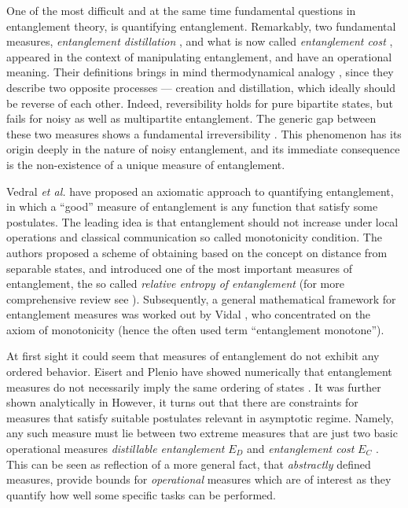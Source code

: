 \documentclass[rmp,12pt,preprint]{revtex4-2}
\begin{document}
One of the most difficult and at the same time fundamental questions
in entanglement theory, is quantifying entanglement. Remarkably, two
fundamental measures, {\it entanglement distillation}
\cite{BBPS1996,BBPSSW1996,BDSW1996}, and what is now called {\it
  entanglement cost} \cite{BDSW1996,cost}, appeared in the context of
manipulating entanglement, and have an operational meaning. Their
definitions brings in mind thermodynamical analogy
\cite{popescu-rohrlich,PlenioVedral1998,termo}, since they describe
two opposite processes --- creation and distillation, which ideally
should be reverse of each other. Indeed, reversibility holds for pure
bipartite states, but fails for noisy as well as multipartite
entanglement. The generic gap between these two measures shows a
fundamental irreversibility
\cite{bound,YangHHS2005-cost,VidalC-irre}. This phenomenon has its
origin deeply in the nature of noisy entanglement, and its immediate
consequence is the non-existence of a unique measure of entanglement.

Vedral \emph{et al.} \cite{VPRK1997,PlenioVedral1998} have proposed an
axiomatic approach to quantifying entanglement, in which a ``good''
measure of entanglement is any function that satisfy some
postulates. The leading idea \cite{BDSW1996} is that entanglement
should not increase under local operations and classical communication
so called monotonicity condition. The authors proposed a scheme of
obtaining based on the concept on distance from separable states, and
introduced one of the most important measures of entanglement, the so
called {\it relative entropy of entanglement}
\cite{VPRK1997,PlenioVedral1998} (for more comprehensive review see
\cite{Vedral2002-rmp}). Subsequently, a general mathematical framework
for entanglement measures was worked out by Vidal
\cite{Vidal-mon2000}, who concentrated on the axiom of monotonicity
(hence the often used term ``entanglement monotone'').


At first sight it could seem that measures of entanglement do not
exhibit any ordered behavior. Eisert and Plenio have showed
numerically that entanglement measures do not necessarily imply the
same ordering of states \cite{EisertPlenio_order}. It was further
shown analytically in \cite{GrudkaMiranowicz_order}
However, it turns out that there are constraints for measures that
satisfy suitable postulates relevant in asymptotic regime. Namely, any
such measure must lie between two extreme measures that are just two
basic operational measures {\it distillable entanglement} $E_D$ and
{\it entanglement cost} $E_C$ \cite{limits}. This can be seen as
reflection of a more general fact, that {\it abstractly} defined
measures, provide bounds for {\it operational} measures which are of
interest as they quantify how well some specific tasks can be
performed.
\end{document}
